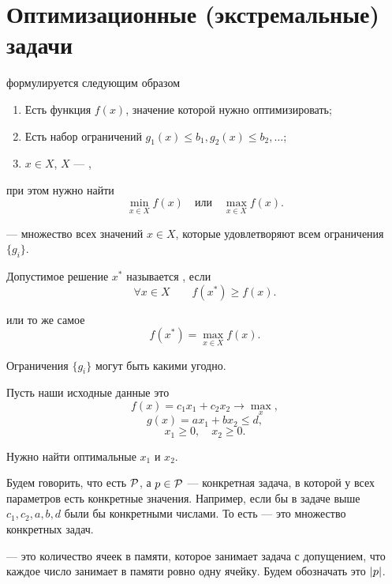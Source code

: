 \section{Оптимизационные (экстремальные) задачи}


 формулируется следующим образом

\begin{enumerate}[nosep]
	\item Есть функция $f(x)$, значение которой нужно оптимизировать;
	
	\item Есть набор ограничений $g_1(x) \le b_1, g_2(x) \le b_2, \dots$;
	
	\item $x \in X$, $X$ --- ,
\end{enumerate}

при этом нужно найти
\[\min_{x \in X} f(x) \quad \text{или} \quad \max_{x \in X} f(x).\]


 --- множество всех значений $x \in X$, которые удовлетворяют всем ограничения $\{g_i\}$.


Допустимое решение $x^*$ называется , если
\[\forall x \in X \qquad f(x^*) \ge f(x).\]

или то же самое
\[f(x^*) = \max_{x \in X} f(x).\]

\remark

Ограничения $\{g_i\}$ могут быть какими угодно.

\example

Пусть наши исходные данные это
\[f(x) = c_1 x_1 + c_2 x_2 \to \max_x,\]
\[g(x) = ax_1 + bx_2 \le d,\]
\[x_1 \ge 0, \quad x_2 \ge 0.\]

Нужно найти оптимальные $x_1$ и $x_2$.


Будем говорить, что есть  $\P$, а $p \in \P$ --- конкретная задача, в которой у всех параметров есть конкретные значения. Например, если бы в задаче выше $c_1, c_2, a, b, d$ были бы конкретными числами. То есть  --- это множество конкретных задач.


 --- это количество ячеек в памяти, которое занимает задача с допущением, что каждое число занимает в памяти ровно одну ячейку. Будем обозначать это $\abs{p}$.

